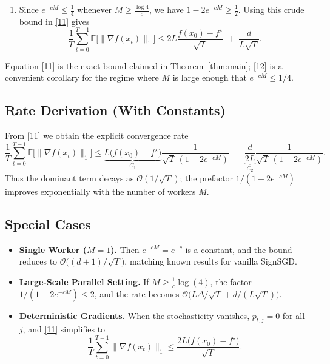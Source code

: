\documentclass{article}
\newcommand{\E}{\mathbb{E}}
\begin{document}
\begin{enumerate}
\item[Step 10.] Since $e^{-cM}\le\frac14$ whenever $M\ge\frac{\log 4}{c}$,
we have $1-2e^{-cM}\ge\frac12$.  Using this crude bound in \eqref{11} gives
\[
\frac{1}{T}\sum_{t=0}^{T-1}\E\!\big[\|\nabla f(x_{t})\|_{1}\big]
   \le
   2L\frac{f(x_{0})-f^{\star}}{\sqrt{T}}
   \;+\;
   \frac{d}{L\sqrt{T}}.
\tag{12}
\]

\end{enumerate}
Equation \eqref{11} is the exact bound claimed in Theorem~\ref{thm:main};
\eqref{12} is a convenient corollary for the regime where $M$ is large
enough that $e^{-cM}\le 1/4$.

\subsection*{Rate Derivation (With Constants)}
From \eqref{11} we obtain the explicit convergence rate
\[
\boxed{
\frac{1}{T}\sum_{t=0}^{T-1}\E\!\big[\|\nabla f(x_{t})\|_{1}\big]
\le
\underbrace{L\big(f(x_{0})-f^{\star}\big)}_{\displaystyle C_{1}}
\frac{1}{\sqrt{T}\,(1-2e^{-cM})}
\;+\;
\underbrace{\frac{d}{2L}}_{\displaystyle C_{2}}
\frac{1}{\sqrt{T}\,(1-2e^{-cM})}}.
\]
Thus the dominant term decays as $\mathcal{O}(1/\sqrt{T})$; the prefactor
$1/(1-2e^{-cM})$ improves exponentially with the number of workers $M$.

\subsection*{Special Cases}
\begin{itemize}[leftmargin=*]
\item \textbf{Single Worker ($M=1$).}  Then $e^{-cM}=e^{-c}$ is a constant, and the
bound reduces to $\mathcal{O}\!\big((d+1)/\sqrt{T}\big)$, matching known results
for vanilla SignSGD.
\item \textbf{Large‑Scale Parallel Setting.}  If $M\ge\frac{1}{c}\log(4)$,
the factor $1/(1-2e^{-cM})\le 2$, and the rate becomes
$\mathcal{O}\!\big(L\Delta/\sqrt{T}+d/(L\sqrt{T})\big)$.
\item \textbf{Deterministic Gradients.}  When the stochasticity vanishes,
$p_{t,j}=0$ for all $j$, and \eqref{11} simplifies to
\[
\frac{1}{T}\sum_{t=0}^{T-1}\|\nabla f(x_{t})\|_{1}
   \le \frac{2L\big(f(x_{0})-f^{\star}\big)}{\sqrt{T}}.
\]
\end{itemize}
\end{document}
